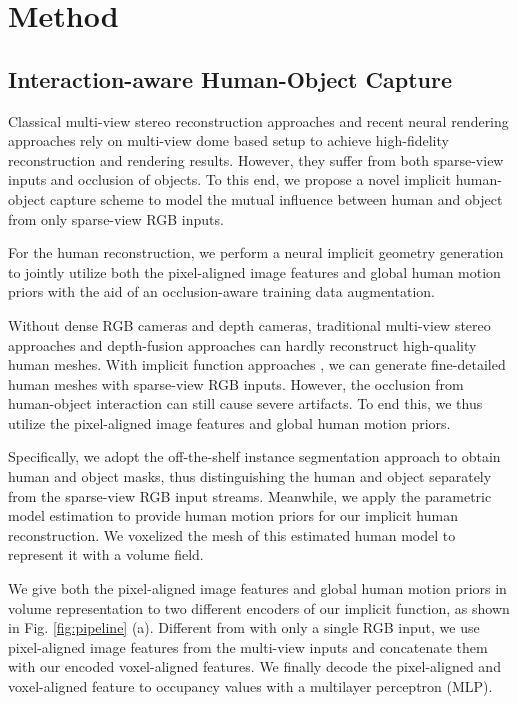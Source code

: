 \section{Method}\label{sec:method}
%

\subsection{Interaction-aware Human-Object Capture}\label{sec:human_capture}
Classical multi-view stereo reconstruction approaches \citep{Furukawa2013,Strecha2008,Newcombe2011,collet2015high} and recent neural rendering approaches \citep{Wu_2020_CVPR,NeuralVolumes,nerf} rely on multi-view dome based setup to achieve high-fidelity reconstruction and rendering results.
%
However, they suffer from both sparse-view inputs and occlusion of objects.
%
To this end, we propose a novel implicit human-object capture scheme to model the mutual influence between human and object from only sparse-view RGB inputs.

For the human reconstruction, we perform a neural implicit geometry generation to jointly utilize both the pixel-aligned image features and global human motion priors with the aid of an occlusion-aware training data augmentation.
% 

Without dense RGB cameras and depth cameras, traditional multi-view stereo approaches \citep{collet2015high,motion2fusion} and depth-fusion approaches \citep{KinectFusion,UnstructureLan,robustfusion} can hardly reconstruct high-quality human meshes.
%
With implicit function approaches \citep{PIFU_2019ICCV,PIFuHD}, we can generate fine-detailed human meshes with sparse-view RGB inputs.
%
However, the occlusion from human-object interaction can still cause severe artifacts.
%
To end this, we thus utilize the pixel-aligned image features and global human motion priors.

% 
Specifically, we adopt the off-the-shelf instance segmentation approach \citep{Bolya_2019_ICCV} to obtain human and object masks, thus distinguishing the human and object separately from the sparse-view RGB input streams.
%
Meanwhile, we apply the parametric model estimation to provide human motion priors for our implicit human reconstruction.
%
We voxelized the mesh of this estimated human model to represent it with a volume field.

We give both the pixel-aligned image features and global human motion priors in volume representation to two different encoders of our implicit function, as shown in Fig. \ref{fig:pipeline} (a).
%
Different from \cite{2020phosa_Arrangements} with only a single RGB input, we use pixel-aligned image features from the multi-view inputs and concatenate them with our encoded voxel-aligned features.
%
We finally decode the pixel-aligned and voxel-aligned feature to occupancy values with a multilayer perceptron (MLP).

